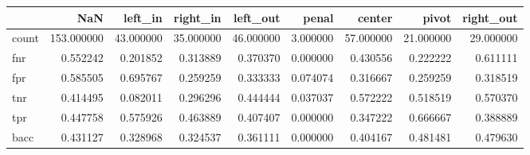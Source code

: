 \begin{tabular}{lrrrrrrrr}
\toprule
{} &         NaN &    left\_in &   right\_in &   left\_out &     penal &     center &      pivot &  right\_out \\
\midrule
count &  153.000000 &  43.000000 &  35.000000 &  46.000000 &  3.000000 &  57.000000 &  21.000000 &  29.000000 \\
fnr   &    0.552242 &   0.201852 &   0.313889 &   0.370370 &  0.000000 &   0.430556 &   0.222222 &   0.611111 \\
fpr   &    0.585505 &   0.695767 &   0.259259 &   0.333333 &  0.074074 &   0.316667 &   0.259259 &   0.318519 \\
tnr   &    0.414495 &   0.082011 &   0.296296 &   0.444444 &  0.037037 &   0.572222 &   0.518519 &   0.570370 \\
tpr   &    0.447758 &   0.575926 &   0.463889 &   0.407407 &  0.000000 &   0.347222 &   0.666667 &   0.388889 \\
bacc  &    0.431127 &   0.328968 &   0.324537 &   0.361111 &  0.000000 &   0.404167 &   0.481481 &   0.479630 \\
\bottomrule
\end{tabular}
